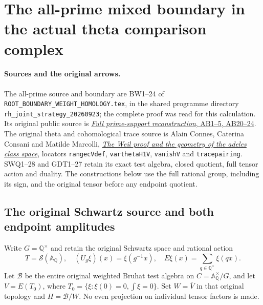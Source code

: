 \section{The all-prime mixed boundary in the actual theta comparison complex}
\label{sec:global-boundary-cone-lift}

\paragraph{Sources and the original arrows.}
The all-prime source and boundary are BW1--24 of
\texttt{ROOT\_BOUNDARY\_WEIGHT\_HOMOLOGY.tex}, in the shared
programme directory \texttt{rh\_joint\_strategy\_20260923}; the
complete proof was read for this calculation. Its original
public source is
\href{https://github.com/KokunoYumeto/zeta-function-research-reader/blob/3c78cfbd9e194d35117b33277c421c6564ce3dbf/workbenches/splitzero-tandem/continuations/20260923-full-prime-support/031/01_REBUILT_MATHEMATICS.tex}{\emph{Full prime-support reconstruction}, AB1--5, AB20--24}.
The original theta and cohomological trace source is Alain Connes,
Caterina Consani and Matilde Marcolli,
\href{https://arxiv.org/abs/math/0703392v1}{\emph{The Weil proof and
the geometry of the adeles class space}}, locators
\texttt{rangecVdef}, \texttt{varthetaH1V}, \texttt{vanishV} and
\texttt{tracepairing}. SWQ1--28 and GDT1--27 retain its exact
test algebra, closed quotient, full tensor action and duality.
The constructions below use the full rational group, including
its sign, and the original tensor before any endpoint quotient.

\subsection{The original Schwartz source and both endpoint amplitudes}

Write $G=\mathbb Q^\times$ and retain the original Schwartz space
and rational action
\begin{equation}\tag{GBC1}
 T=\mathcal S(\mathbb A_{\mathbb Q}),\quad
 (U_g\xi)(x)=\xi(g^{-1}x),\quad
 E\xi(x)=\sum_{q\in\mathbb Q^\times}\xi(qx).
\end{equation}
Let $\mathscr B$ be the entire original weighted Bruhat test
algebra on $C=\mathbb A_{\mathbb Q}^\times/G$, and let
$V=E(T_0)$, where $T_0=\{\xi:\xi(0)=0,\int\xi=0\}$.
Set $W=\overline V$ in that original topology and $H=\mathscr B/W$.
No even projection on individual tensor factors is made.

